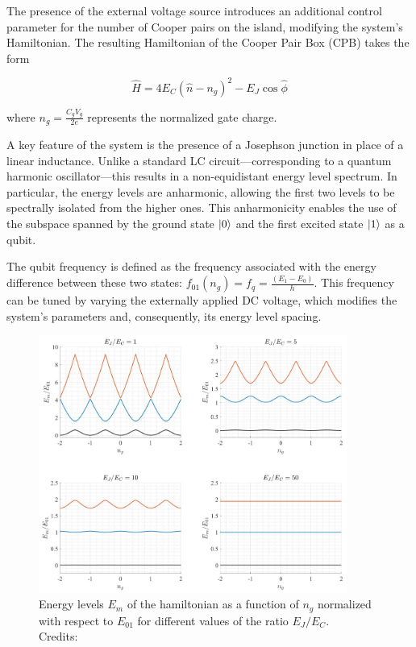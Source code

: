 The presence of the external voltage source introduces an additional control parameter for the number of Cooper pairs on the island, modifying the system's Hamiltonian. 
The resulting Hamiltonian of the Cooper Pair Box (CPB) takes the form

\begin{equation}\label{eq:CPB_complete}
    \hat{H} = 4E_C(\hat{n} - n_g)^2 - E_J \cos{\hat{\phi}}
\end{equation}

where $n_g = \frac{C_g V_g}{2e}$ represents the normalized gate charge.

A key feature of the system is the presence of a Josephson junction in place of a linear inductance. 
Unlike a standard LC circuit—corresponding to a quantum harmonic oscillator—this results in a non-equidistant energy level spectrum. 
In particular, the energy levels are anharmonic, allowing the first two levels to be spectrally isolated from the higher ones. 
This anharmonicity enables the use of the subspace spanned by the ground state $\ket{0}$ and the first excited state $\ket{1}$ as a qubit.

The qubit frequency is defined as the frequency associated with the energy difference between these two states: $f_{01}(n_g) = f_q = \frac{(E_1 - E_0)}{h}$.
This frequency can be tuned by varying the externally applied DC voltage, which modifies the system’s parameters and, consequently, its energy level spacing.\\

\begin{figure}[h!]
    \centering
    \includegraphics[width=0.9\textwidth]{figures/png/energy_levels.png}
    \caption{Energy levels $E_m$ of the hamiltonian as a function of $n_g$ normalized with respect to $E_{01}$ for different values of the ratio $E_J/E_C$. \\ Credits: \cite{Roth_2023}}
    \label{fig:energy_levels}
\end{figure}


